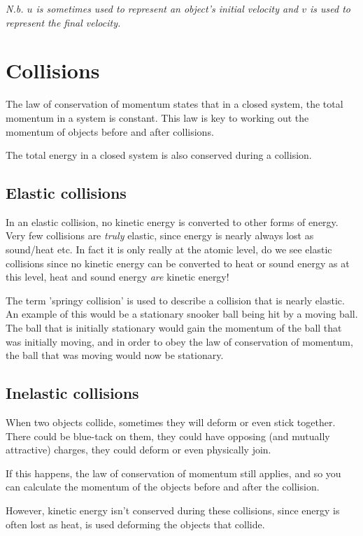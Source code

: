 \documentclass{article}
\begin{document}
\textit{N.b. $u$ is sometimes used to represent an object's initial velocity and
$v$ is used to represent the final velocity.}

\section*{Collisions}
\label{sec:Collisions}
The law of conservation of momentum states that in a closed system, the total
momentum in a system is constant. This law is key to working out the momentum of
objects before and after collisions.

The total energy in a closed system is also conserved during a collision.


\subsection*{Elastic collisions}
\label{sec:ElasticCollisions}
In an elastic collision, no kinetic energy is converted to other forms of
energy.
Very few collisions are \textit{truly} elastic, since energy is nearly always
lost as sound/heat etc. In fact it is only really at the atomic level, do we see
elastic collisions since no kinetic energy can be converted to heat or sound
energy as at this level, heat and sound energy \textit{are} kinetic energy!

The term 'springy collision' is used to describe a collision that is nearly
elastic. An example of this would be a stationary snooker ball being hit by a
moving ball. The ball that is initially stationary would gain the momentum of
the ball that was initially moving, and in order to obey the law of conservation
of momentum, the ball that was moving would now be stationary.


\subsection*{Inelastic collisions}
\label{sec:InelasticCollisions}
When two objects collide, sometimes they will deform or even stick together.
There could be blue-tack on them, they could have opposing (and mutually
attractive) charges, they could deform or even physically join.

If this happens, the law of conservation of momentum still applies, and so you
can calculate the momentum of the objects before and after the collision.

However, kinetic energy isn't conserved during these collisions, since energy is
often lost as heat, is used deforming the objects that collide.
\end{document}
